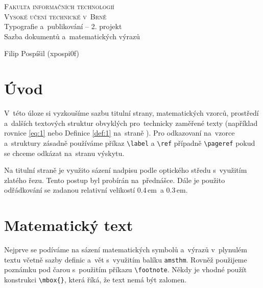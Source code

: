 \documentclass[a4paper, 11pt, twocolumn]{article}
\begin{document}
	\begin{titlepage}
		\begin{center}
			{\Huge\textsc{
				Fakulta informačních technologií \\ \vspace{0.4em}
				Vysoké učení technické v~Brně
			}}
			{\LARGE
				\\ Typografie a~publikování -- 2. projekt \\
				\vspace{0.3em}
				Sazba dokumentů a~matematických výrazů
			}
		\end{center}

		{\Large
			\the\year
			\hfill
			Filip Pospíšil (xpospi0f)
		}
  \end{titlepage}

	\section*{Úvod}
	V~této úloze si vyzkoušíme sazbu titulní strany, matematic\-kých vzorců, prostředí a~dalších textových struktur obvyklých pro~technicky zaměřené texty (například rovnice \eqref{eq:1} nebo Definice \ref{def:1} na~straně \pageref{def:1}). Pro odkazovaní na~vzorce a~struktury zásadně používáme příkaz \verb|\label| a \verb|\ref| případně \verb|\pageref| pokud se chceme odkázat na~stranu výskytu.
	\par
	Na titulní straně je využito sázení nadpisu podle optického středu s~využitím zlatého řezu. Tento postup byl probírán na~přednášce. Dále je použito odřádkování se zadanou relativní velikostí 0.4\,em~a 0.3\,em.

	\section{Matematický text}
	Nejprve se podíváme na sázení matematických symbolů a~výrazů v~plynulém textu včetně sazby definic a~vět s~využitím balíku \texttt{amsthm}. Rovněž použijeme poznámku pod čarou s~použitím příkazu \verb|\footnote|. Někdy je vhodné použít konstrukci \verb|\mbox{}|, která říká, že text nemá být zalomen.
\end{document}
